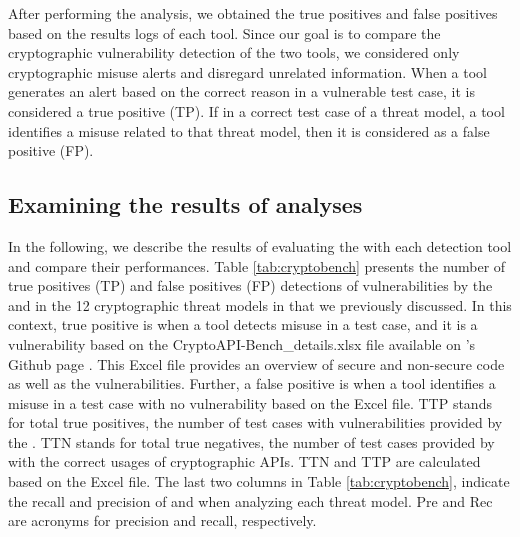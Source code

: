 After performing the analysis, we obtained the true positives and false positives based on the results logs of each tool. Since our goal is to compare the cryptographic vulnerability detection of the two tools, we considered only cryptographic misuse alerts and disregard unrelated information. When a tool generates an alert based on the correct reason in a vulnerable test case, it is considered a true positive (TP). If in a correct test case of a threat model, a tool identifies a misuse related to that threat model, then it is considered as a false positive (FP).




\subsection{Examining the results of analyses}

In the following, we describe the results of evaluating the \cryptoapibench{} with each detection tool and compare their performances. Table \ref{tab:cryptobench} presents the number of true positives (TP) and false positives (FP) detections of vulnerabilities by the \codyze{} and \cognicryptsast{} in the 12 cryptographic threat models in \cryptoapibench{} that we previously discussed. In this context, true positive is when a tool detects misuse in a test case, and it is a vulnerability based on the CryptoAPI-Bench\_details.xlsx file available on \cryptoapibench's Github page \cite{benchgithub}. This Excel file provides an overview of secure and non-secure code as well as the vulnerabilities. Further, a false positive is when a tool identifies a misuse in a test case with no vulnerability based on the Excel file. TTP stands for total true positives, the number of test cases with vulnerabilities provided by the \cryptoapibench. TTN stands for total true negatives, the number of test cases provided by \cryptoapibench{} with the correct usages of cryptographic APIs. TTN and TTP are calculated based on the Excel file. The last two columns in Table \ref{tab:cryptobench}, indicate the recall and precision of \codyze{} and \cognicryptsast{} when analyzing each threat model. Pre and Rec are acronyms for precision and recall, respectively.

